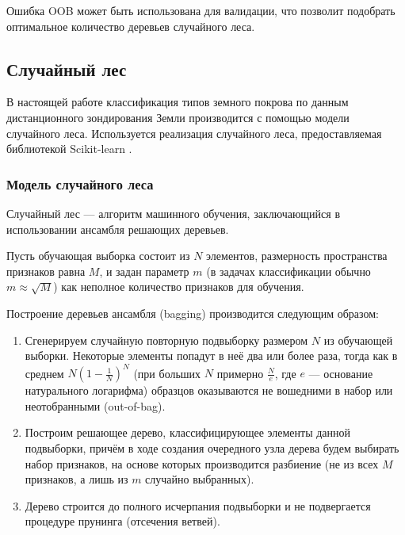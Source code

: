 \documentclass[14pt, a4paper, oneside]{extarticle}
\begin{document}
Ошибка OOB может быть использована для валидации, что позволит подобрать оптимальное количество деревьев случайного леса.

\subsection{Случайный лес}



В настоящей работе классификация типов земного покрова по данным дистанционного зондирования Земли производится с помощью модели случайного леса. Используется реализация случайного леса, предоставляемая библиотекой Scikit-learn \cite{sklearn}.

\subsubsection{Модель случайного леса}
Случайный лес --- алгоритм машинного обучения, заключающийся в использовании ансамбля решающих деревьев.

Пусть обучающая выборка состоит из $N$ элементов, размерность пространства признаков равна $M$, и задан параметр $m$ (в задачах классификации обычно $m \approx \sqrt{M}$) как неполное количество признаков для обучения.

Построение деревьев ансамбля (bagging) производится следующим образом:
\begin{enumerate}
    \item Сгенерируем случайную повторную подвыборку размером $N$ из обучающей выборки. Некоторые элементы попадут в неё два или более раза, тогда как в среднем $N(1-\frac{1}{N})^N$ (при больших $N$ примерно $\frac{N}{e}$, где $e$ --- основание натурального логарифма) образцов оказываются не вошедними в набор или неотобранными (out-of-bag).
    \item Построим решающее дерево, классифицирующее элементы данной подвыборки, причём в ходе создания очередного узла дерева будем выбирать набор признаков, на основе которых производится разбиение (не из всех $M$ признаков, а лишь из $m$ случайно выбранных).
    \item Дерево строится до полного исчерпания подвыборки и не подвергается процедуре прунинга (отсечения ветвей).
\end{enumerate}
\end{document}
